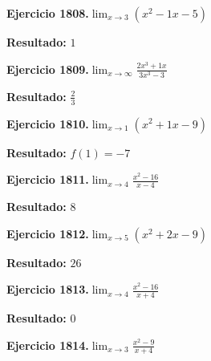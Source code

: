 \documentclass[10pt,a4paper]{article}
\begin{document}
\begin{ejbox}
\textbf{Ejercicio 1808.}\quad $\lim_{x\to 3} (x^2 -1x -5)$
\end{ejbox}

\begin{solbox}
\textbf{Resultado:} \(\displaystyle 1\)
\end{solbox}

\begin{ejbox}
\textbf{Ejercicio 1809.}\quad $\lim_{x\to \infty} \frac{2x^3 + 1x}{3x^3 - 3}$
\end{ejbox}

\begin{solbox}
\textbf{Resultado:} \(\displaystyle \frac{2}{3}\)
\end{solbox}

\newpage
\begin{ejbox}
\textbf{Ejercicio 1810.}\quad $\lim_{x\to 1} (x^2 +1x -9)$
\end{ejbox}

\begin{solbox}
\textbf{Resultado:} \(\displaystyle f(1) = -7\)
\end{solbox}

\begin{ejbox}
\textbf{Ejercicio 1811.}\quad $\lim_{x\to 4} \frac{x^2-16}{x-4}$
\end{ejbox}

\begin{solbox}
\textbf{Resultado:} \(\displaystyle 8\)
\end{solbox}

\begin{ejbox}
\textbf{Ejercicio 1812.}\quad $\lim_{x\to 5} (x^2 +2x -9)$
\end{ejbox}

\begin{solbox}
\textbf{Resultado:} \(\displaystyle 26\)
\end{solbox}

\newpage
\begin{ejbox}
\textbf{Ejercicio 1813.}\quad $\lim_{x\to 4} \frac{x^2-16}{x+4}$
\end{ejbox}

\begin{solbox}
\textbf{Resultado:} \(\displaystyle 0\)
\end{solbox}

\begin{ejbox}
\textbf{Ejercicio 1814.}\quad $\lim_{x\to 3} \frac{x^2-9}{x+4}$
\end{ejbox}
\end{document}
